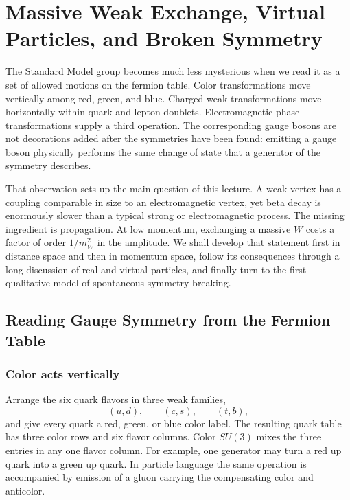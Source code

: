 \chapter{Massive Weak Exchange, Virtual Particles, and Broken Symmetry}

The Standard Model group becomes much less mysterious when we read it as a
set of allowed motions on the fermion table. Color transformations move
vertically among red, green, and blue. Charged weak transformations move
horizontally within quark and lepton doublets. Electromagnetic phase
transformations supply a third operation. The corresponding gauge bosons are
not decorations added after the symmetries have been found: emitting a gauge
boson physically performs the same change of state that a generator of the
symmetry describes.

That observation sets up the main question of this lecture. A weak vertex has
a coupling comparable in size to an electromagnetic vertex, yet beta decay is
enormously slower than a typical strong or electromagnetic process. The
missing ingredient is propagation. At low momentum, exchanging a massive
\(W\) costs a factor of order \(1/m_W^2\) in the amplitude. We shall develop
that statement first in distance space and then in momentum space, follow its
consequences through a long discussion of real and virtual particles, and
finally turn to the first qualitative model of spontaneous symmetry breaking.

\section{Reading Gauge Symmetry from the Fermion Table}

\subsection{Color acts vertically}

Arrange the six quark flavors in three weak families,
\begin{equation}
  (u,d),\qquad(c,s),\qquad(t,b),
\end{equation}
and give every quark a red, green, or blue color label. The resulting quark
table has three color rows and six flavor columns. Color \(SU(3)\) mixes the
three entries in any one flavor column. For example, one generator may turn a
red up quark into a green up quark. In particle language the same operation is
accompanied by emission of a gluon carrying the compensating color and
anticolor.

